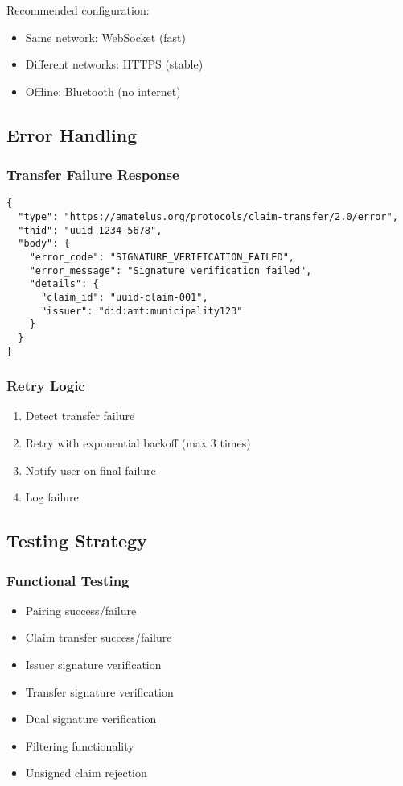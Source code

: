 Recommended configuration:
\begin{itemize}
  \item Same network: WebSocket (fast)
  \item Different networks: HTTPS (stable)
  \item Offline: Bluetooth (no internet)
\end{itemize}

\subsection{Error Handling}

\subsubsection{Transfer Failure Response}

\begin{verbatim}
{
  "type": "https://amatelus.org/protocols/claim-transfer/2.0/error",
  "thid": "uuid-1234-5678",
  "body": {
    "error_code": "SIGNATURE_VERIFICATION_FAILED",
    "error_message": "Signature verification failed",
    "details": {
      "claim_id": "uuid-claim-001",
      "issuer": "did:amt:municipality123"
    }
  }
}
\end{verbatim}

\subsubsection{Retry Logic}

\begin{enumerate}
  \item Detect transfer failure
  \item Retry with exponential backoff (max 3 times)
  \item Notify user on final failure
  \item Log failure
\end{enumerate}

\subsection{Testing Strategy}

\subsubsection{Functional Testing}

\begin{itemize}
  \item Pairing success/failure
  \item Claim transfer success/failure
  \item Issuer signature verification
  \item Transfer signature verification
  \item Dual signature verification
  \item Filtering functionality
  \item Unsigned claim rejection
\end{itemize}

